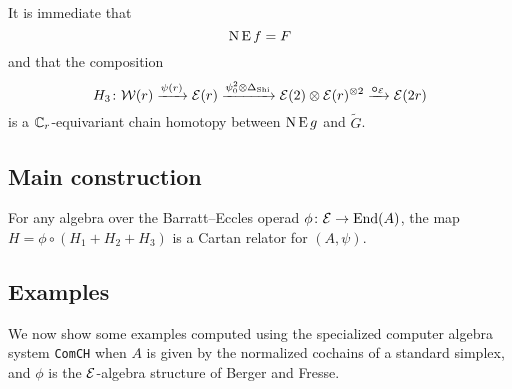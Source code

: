It is immediate that
\[
\operatorname{N}\operatorname{E} f = F
\]
and that the composition
\[
H_3 \colon \mathcal{W}(r) \xrightarrow{\psi(r)} \mathcal{E}(r) \xrightarrow{\psi^2_0 \otimes \Delta_{\operatorname{Shi}}} \mathcal{E}(2) \otimes \mathcal{E}(r)^{\otimes 2} \xrightarrow{\bm{\circ}_{\mathcal{E}}} \mathcal{E}(2r)
\]
is a $\mathbb{C}_r$-equivariant chain homotopy between $\operatorname{N}\operatorname{E} g$ and $\widetilde G$.


\subsection{Main construction}

\begin{theorem}
	For any algebra over the Barratt--Eccles operad $\phi \colon \mathcal{E} \to \mathrm{End}(A)$, the map $H = \phi \circ (H_1 + H_2 + H_3)$ is a Cartan relator for $(A,\psi)$.
\end{theorem}

\subsection{Examples}

We now show some examples computed using the specialized computer algebra system \texttt{ComCH} \cite{medina2021comch} when $A$ is given by the normalized cochains of a standard simplex, and $\phi$ is the $\mathcal{E}$-algebra structure of Berger and Fresse.
